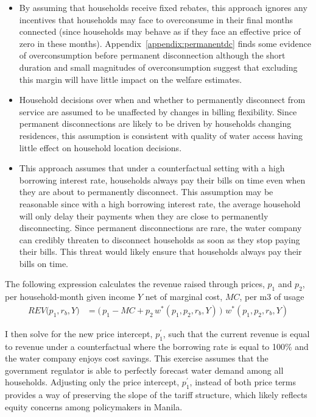 \documentclass[12pt]{article}
\begin{document}
\begin{enumerate}
\begin{itemize}
    \item By assuming that households receive fixed rebates, this approach ignores any incentives that households may face to overconsume in their final months connected (since households may behave as if they face an effective price of zero in these months).  Appendix~\ref{appendix:permanentdc} finds some evidence of overconsumption before permanent disconnection although the short duration and small magnitudes of overconsumption suggest that excluding this margin will have little impact on the welfare estimates.

    \item Household decisions over when and whether to permanently disconnect from service are assumed to be unaffected by changes in billing flexibility.  Since permanent disconnections are likely to be driven by households changing residences, this assumption is consistent with quality of water access having little effect on household location decisions.

    \item This approach assumes that under a counterfactual setting with a high borrowing interest rate, households always pay their bills on time even when they are about to permanently disconnect.  This assumption may be reasonable since with a high borrowing interest rate, the average household will only delay their payments when they are close to permanently disconnecting.  Since permanent disconnections are rare, the water company can credibly threaten to disconnect households as soon as they stop paying their bills.  This threat would likely ensure that households always pay their bills on time.
\end{itemize}    
\end{enumerate}  

The following expression calculates the revenue raised through prices,  $p_1$ and $p_2$, per household-month given income $Y$ net of marginal cost, $MC$, per m3 of usage
\begin{align*}
REV \big(p_1,r_b,Y \big) &= \Big ( \,  p_1 - MC +  p_2 \, w^{*}(p_1,p_2,r_b,Y)  \,  \Big ) \, \, w^{*}(p_1,p_2,r_b,Y)
\end{align*}


I then solve for the new price intercept, $p^{\prime}_1$, such that the current revenue is equal to revenue under a counterfactual where the borrowing rate is equal to 100\% and the water company enjoys cost savings.   This exercise assumes that the government regulator is able to perfectly forecast water demand among all households.  Adjusting only the price intercept, $p^{\prime}_1$, instead of both price terms provides a way of preserving the slope of the tariff structure, which likely reflects equity concerns among policymakers in Manila.  
\end{document}
